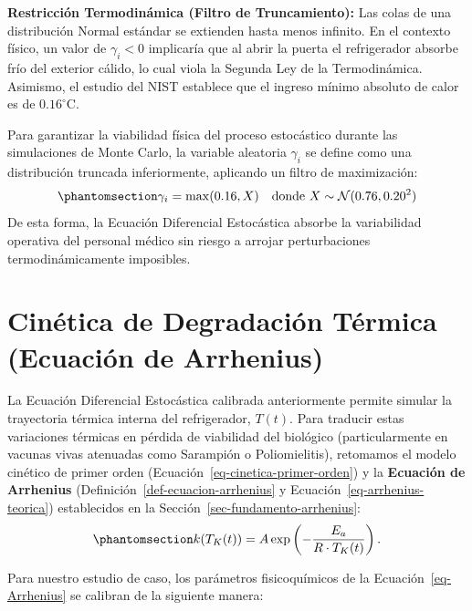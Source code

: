 \documentclass[
  spanish,
  us-letterpaper,
]{scrreprt}
\numberwithin{equation}{section}
\theoremstyle{plain}
\theoremstyle{plain}
\theoremstyle{definition}
\theoremstyle{plain}
\theoremstyle{remark}
\begin{document}
\textbf{Restricción Termodinámica (Filtro de Truncamiento):} Las colas
de una distribución Normal estándar se extienden hasta menos infinito.
En el contexto físico, un valor de \(\gamma_i < 0\) implicaría que al
abrir la puerta el refrigerador absorbe frío del exterior cálido, lo
cual viola la Segunda Ley de la Termodinámica. Asimismo, el estudio del
NIST establece que el ingreso mínimo absoluto de calor es de
\(0.16^\circ\text{C}\).

Para garantizar la viabilidad física del proceso estocástico durante las
simulaciones de Monte Carlo, la variable aleatoria \(\gamma_i\) se
define como una distribución truncada inferiormente, aplicando un filtro
de maximización:
\begin{equation}\phantomsection\label{eq-salto-termico}{\gamma_i = \max(0.16, X) \quad \text{donde } X \sim \mathcal{N}(0.76, 0.20^2)}\end{equation}
De esta forma, la Ecuación Diferencial Estocástica absorbe la
variabilidad operativa del personal médico sin riesgo a arrojar
perturbaciones termodinámicamente imposibles.

\section{Cinética de Degradación Térmica (Ecuación de
Arrhenius)}\label{sec-Arrhenius}

La Ecuación Diferencial Estocástica calibrada anteriormente permite
simular la trayectoria térmica interna del refrigerador, \(T(t)\). Para
traducir estas variaciones térmicas en pérdida de viabilidad del
biológico (particularmente en vacunas vivas atenuadas como Sarampión o
Poliomielitis), retomamos el modelo cinético de primer orden
(Ecuación~\ref{eq-cinetica-primer-orden}) y la \textbf{Ecuación de
Arrhenius} (Definición~\ref{def-ecuacion-arrhenius} y
Ecuación~\ref{eq-arrhenius-teorica}) establecidos en la
Sección~\ref{sec-fundamento-arrhenius}:
\begin{equation}\phantomsection\label{eq-Arrhenius}{
k(T_K(t)) = A \exp\left(-\frac{E_a}{R \cdot T_K(t)}\right).
}\end{equation}

Para nuestro estudio de caso, los parámetros fisicoquímicos de la
Ecuación~\ref{eq-Arrhenius} se calibran de la siguiente manera:
\end{document}
